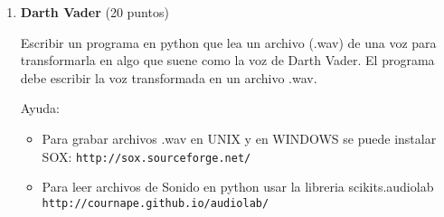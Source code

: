 \documentclass{article}
\begin{document}
\begin{enumerate}
\item {\bf Darth Vader} (20 puntos)

Escribir un programa en python que lea un archivo (.wav) de una
voz para transformarla en algo que suene como la voz de Darth Vader. El programa debe escribir la voz transformada en un archivo .wav.



Ayuda:
\begin{itemize}
\item Para grabar archivos .wav en UNIX y en WINDOWS  se puede
  instalar SOX:
  \verb"http://sox.sourceforge.net/"
  
\item 
  Para leer archivos de Sonido en python usar la libreria
  scikits.audiolab
 \verb"http://cournape.github.io/audiolab/"
\end{itemize}

\end{enumerate}
\end{document}
